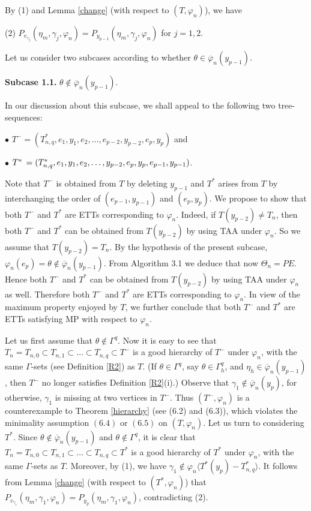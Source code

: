 \documentclass[11pt]{article}
\begin{document}
By (1) and Lemma \ref{change} (with respect to $(T, \varphi_n)$), we have 

(2) $P_{v_{\gamma_j}}(\eta_m, \gamma_{j},\varphi_n)=P_{y_{p-1}}(\eta_m,\gamma_{j},\varphi_n)$ for $j=1,2$. 

\vskip 2mm

Let us consider two subcases according to whether $\theta\in\overline{\varphi}_n(y_{p-1})$.

{\bf Subcase 1.1.} $\theta\notin\overline{\varphi}_n(y_{p-1})$.

In our discussion about this subcase, we shall appeal to the following two tree-sequences:

\vskip 1mm
$\bullet$ $T^-=(T_{n,q}^*, e_1, y_1, e_2, \ldots, e_{p-2}, y_{p-2}, e_p, y_p)$ and

\vskip 1mm
$\bullet$ $T^* \hskip 0.6mm =(T_{n,q}^*, e_1, y_1, e_2, \ldots ,y_{p-2}, e_p, y_p, e_{p-1}, y_{p-1})$.

\vskip 1mm
\noindent Note that $T^-$ is obtained from $T$ by deleting $y_{p-1}$ and $T^*$ arises from $T$ by interchanging
the order of $(e_{p-1}, y_{p-1})$ and $(e_p, y_p)$. We propose to show that both $T^-$ and $T^*$ are ETTs corresponding
to $\varphi_n$. Indeed, if $T(y_{p-2}) \ne T_n$, then both $T^-$ and $T^*$ can be obtained from  $T(y_{p-2})$ 
by using TAA under $\varphi_n$.  So we assume that $T(y_{p-2})= T_n$.  By the hypothesis of the present subcase, $\varphi_n(e_p)=\theta \notin\overline{\varphi}_n(y_{p-1})$. From Algorithm 3.1 we deduce that now $\Theta_n=PE$. 
Hence both $T^-$ and $T^*$ can be obtained from  $T(y_{p-2})$ by using TAA under $\varphi_n$ as well.  Therefore
both $T^-$ and $T^*$ are ETTs corresponding to $\varphi_n$. In view of the maximum property enjoyed by $T$, we
further conclude that both $T^-$ and $T^*$ are ETTs satisfying MP with respect to $\varphi_n$. 

Let us first assume that $\theta\notin\Gamma^{q}$. Now it is easy to see that $T_n=T_{n,0} \subset T_{n,1} \subset 
\ldots \subset T_{n,q} \subset T^-$ is a good hierarchy of $T^-$ under $\varphi_n$, with the same $\Gamma$-sets 
(see Definition \ref{R2}) as $T$. (If $\theta\in\Gamma^{q}$, say $\theta \in \Gamma^{q}_h$, and 
$\eta_h \in \overline{\varphi}_n(y_{p-1})$, then $T^-$ no longer satisfies Definition \ref{R2}(i).)  Observe that $\gamma_{1} \notin 
\overline{\varphi}_n(y_{p})$, for otherwise, $\gamma_{1}$ is missing at two vertices in $T^-$. Thus $(T^-, \varphi_n)$ is 
a counterexample to Theorem \ref{hierarchy} (see (6.2) and (6.3)), which violates the minimality assumption
$(6.4)$ or $(6.5)$ on $(T, \varphi_n)$. Let us turn to considering $T^*$. Since $\theta \notin\overline{\varphi}_n(y_{p-1})$ and $\theta\notin\Gamma^{q}$, it is clear that $T_n=T_{n,0} \subset T_{n,1} \subset \ldots \subset T_{n,q} \subset 
T^*$ is a good hierarchy of $T^*$ under $\varphi_n$, with the same $\Gamma$-sets as $T$. 
Moreover, by (1), we have $\gamma_{1} \notin \varphi_n \langle T^*(y_{p}) -  T_{n,q}^* \rangle$.
It follows from Lemma \ref{change} (with respect to $(T^*, \varphi_n)$) that
$P_{v_{\gamma_1}}(\eta_m, \gamma_{1},\varphi_n)=P_{y_{p}}(\eta_m,\gamma_{1},\varphi_n)$, contradicting (2).
\end{document}
